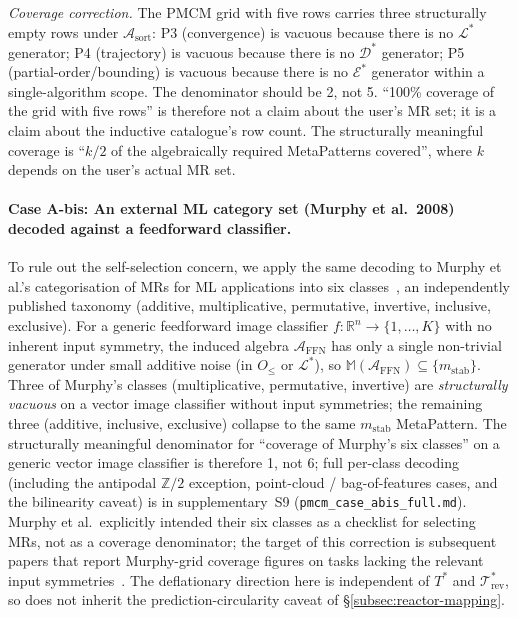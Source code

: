\documentclass[manuscript]{acmart}
\begin{document}
\noindent \emph{Coverage correction.} The PMCM grid with five rows carries three structurally empty rows under $\mathcal{A}_{\mathrm{sort}}$: P3 (convergence) is vacuous because there is no $\mathcal{L}^{*}$ generator; P4 (trajectory) is vacuous because there is no $\mathcal{D}^{*}$ generator; P5 (partial-order/bounding) is vacuous because there is no $\mathcal{E}^{*}$ generator within a single-algorithm scope. The denominator should be 2, not 5. ``100\% coverage of the grid with five rows'' is therefore not a claim about the user's MR set; it is a claim about the inductive catalogue's row count. The structurally meaningful coverage is ``$k/2$ of the algebraically required MetaPatterns covered'', where $k$ depends on the user's actual MR set.

\paragraph{Case A-bis: An external ML category set (Murphy et al.\ 2008) decoded against a feedforward classifier.}
\label{para:case-a-bis}
To rule out the self-selection concern, we apply the same decoding to Murphy et al.'s categorisation of MRs for ML applications into six classes~\cite{Murphy2008, Xie2011, Saha2019SupervisedMR}, an independently published taxonomy (additive, multiplicative, permutative, invertive, inclusive, exclusive). For a generic feedforward image classifier $f: \mathbb{R}^{n} \to \{1, \dots, K\}$ with no inherent input symmetry, the induced algebra $\mathcal{A}_{\mathrm{FFN}}$ has only a single non-trivial generator under small additive noise (in $O_{\le}$ or $\mathcal{L}^{*}$), so $\mathbb{M}(\mathcal{A}_{\mathrm{FFN}}) \subseteq \{m_{\mathrm{stab}}\}$. Three of Murphy's classes (multiplicative, permutative, invertive) are \emph{structurally vacuous} on a vector image classifier without input symmetries; the remaining three (additive, inclusive, exclusive) collapse to the same $m_{\mathrm{stab}}$ MetaPattern. The structurally meaningful denominator for ``coverage of Murphy's six classes'' on a generic vector image classifier is therefore 1, not 6; full per-class decoding (including the antipodal $\mathbb{Z}/2$ exception, point-cloud / bag-of-features cases, and the bilinearity caveat) is in supplementary~S9 (\texttt{pmcm\_case\_abis\_full.md}). Murphy et al.\ explicitly intended their six classes as a checklist for selecting MRs, not as a coverage denominator; the target of this correction is subsequent papers that report Murphy-grid coverage figures on tasks lacking the relevant input symmetries~\cite{Saha2019SupervisedMR}. The deflationary direction here is independent of $T^{*}$ and $\mathcal{T}^{*}_{\mathrm{rev}}$, so does not inherit the prediction-circularity caveat of \S\ref{subsec:reactor-mapping}.
\end{document}
